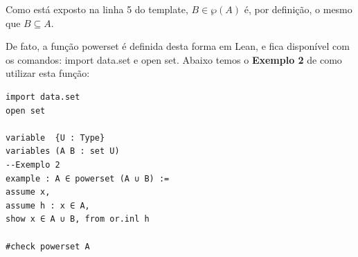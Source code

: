 Como está exposto na linha 5 do template, $B \in \wp(A)$ é, por definição, o mesmo que $B \subseteq A$.

De fato, a função {\selectfont powerset} é definida desta forma em Lean, e fica disponível com os comandos: {\selectfont import data.set} e {\selectfont open set}. Abaixo temos o \textbf{Exemplo 2} de como utilizar esta função:
\begin{lstlisting}
import data.set
open set

variable  {U : Type}
variables (A B : set U)
--Exemplo 2
example : A ∈ powerset (A ∪ B) :=
assume x,
assume h : x ∈ A,
show x ∈ A ∪ B, from or.inl h

#check powerset A \end{lstlisting}


